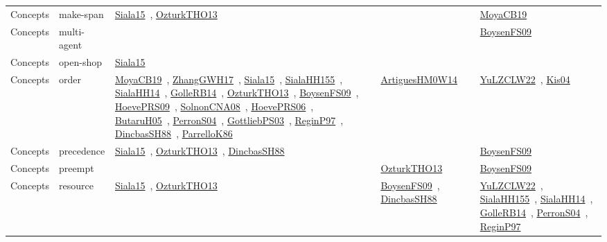 {\begin{longtable}{lp{3cm}>{\raggedright\arraybackslash}p{6cm}>{\raggedright\arraybackslash}p{6cm}>{\raggedright\arraybackslash}p{8cm}}
Concepts & make-span & \href{../cars/works/Siala15.pdf}{Siala15}~\cite{Siala15}, \href{../cars/works/OzturkTHO13.pdf}{OzturkTHO13}~\cite{OzturkTHO13} &  & \href{../cars/works/MoyaCB19.pdf}{MoyaCB19}~\cite{MoyaCB19}\\
Concepts & multi-agent &  &  & \href{../cars/works/BoysenFS09.pdf}{BoysenFS09}~\cite{BoysenFS09}\\
Concepts & open-shop & \href{../cars/works/Siala15.pdf}{Siala15}~\cite{Siala15} &  & \\
Concepts & order & \href{../cars/works/MoyaCB19.pdf}{MoyaCB19}~\cite{MoyaCB19}, \href{../cars/works/ZhangGWH17.pdf}{ZhangGWH17}~\cite{ZhangGWH17}, \href{../cars/works/Siala15.pdf}{Siala15}~\cite{Siala15}, \href{../cars/works/SialaHH155.pdf}{SialaHH155}~\cite{SialaHH155}, \href{../cars/works/SialaHH14.pdf}{SialaHH14}~\cite{SialaHH14}, \href{../cars/works/GolleRB14.pdf}{GolleRB14}~\cite{GolleRB14}, \href{../cars/works/OzturkTHO13.pdf}{OzturkTHO13}~\cite{OzturkTHO13}, \href{../cars/works/BoysenFS09.pdf}{BoysenFS09}~\cite{BoysenFS09}, \href{../cars/works/HoevePRS09.pdf}{HoevePRS09}~\cite{HoevePRS09}, \href{../cars/works/SolnonCNA08.pdf}{SolnonCNA08}~\cite{SolnonCNA08}, \href{../cars/works/HoevePRS06.pdf}{HoevePRS06}~\cite{HoevePRS06}, \href{../cars/works/ButaruH05.pdf}{ButaruH05}~\cite{ButaruH05}, \href{../cars/works/PerronS04.pdf}{PerronS04}~\cite{PerronS04}, \href{../cars/works/GottliebPS03.pdf}{GottliebPS03}~\cite{GottliebPS03}, \href{../cars/works/ReginP97.pdf}{ReginP97}~\cite{ReginP97}, \href{../cars/works/DincbasSH88.pdf}{DincbasSH88}~\cite{DincbasSH88}, \href{../cars/works/ParrelloK86.pdf}{ParrelloK86}~\cite{ParrelloK86} & \href{../cars/works/ArtiguesHM0W14.pdf}{ArtiguesHM0W14}~\cite{ArtiguesHM0W14} & \href{../cars/works/YuLZCLW22.pdf}{YuLZCLW22}~\cite{YuLZCLW22}, \href{../cars/works/Kis04.pdf}{Kis04}~\cite{Kis04}\\
Concepts & precedence & \href{../cars/works/Siala15.pdf}{Siala15}~\cite{Siala15}, \href{../cars/works/OzturkTHO13.pdf}{OzturkTHO13}~\cite{OzturkTHO13}, \href{../cars/works/DincbasSH88.pdf}{DincbasSH88}~\cite{DincbasSH88} &  & \href{../cars/works/BoysenFS09.pdf}{BoysenFS09}~\cite{BoysenFS09}\\
Concepts & preempt &  & \href{../cars/works/OzturkTHO13.pdf}{OzturkTHO13}~\cite{OzturkTHO13} & \href{../cars/works/BoysenFS09.pdf}{BoysenFS09}~\cite{BoysenFS09}\\
Concepts & resource & \href{../cars/works/Siala15.pdf}{Siala15}~\cite{Siala15}, \href{../cars/works/OzturkTHO13.pdf}{OzturkTHO13}~\cite{OzturkTHO13} & \href{../cars/works/BoysenFS09.pdf}{BoysenFS09}~\cite{BoysenFS09}, \href{../cars/works/DincbasSH88.pdf}{DincbasSH88}~\cite{DincbasSH88} & \href{../cars/works/YuLZCLW22.pdf}{YuLZCLW22}~\cite{YuLZCLW22}, \href{../cars/works/SialaHH155.pdf}{SialaHH155}~\cite{SialaHH155}, \href{../cars/works/SialaHH14.pdf}{SialaHH14}~\cite{SialaHH14}, \href{../cars/works/GolleRB14.pdf}{GolleRB14}~\cite{GolleRB14}, \href{../cars/works/PerronS04.pdf}{PerronS04}~\cite{PerronS04}, \href{../cars/works/ReginP97.pdf}{ReginP97}~\cite{ReginP97}\\

\end{longtable}}

